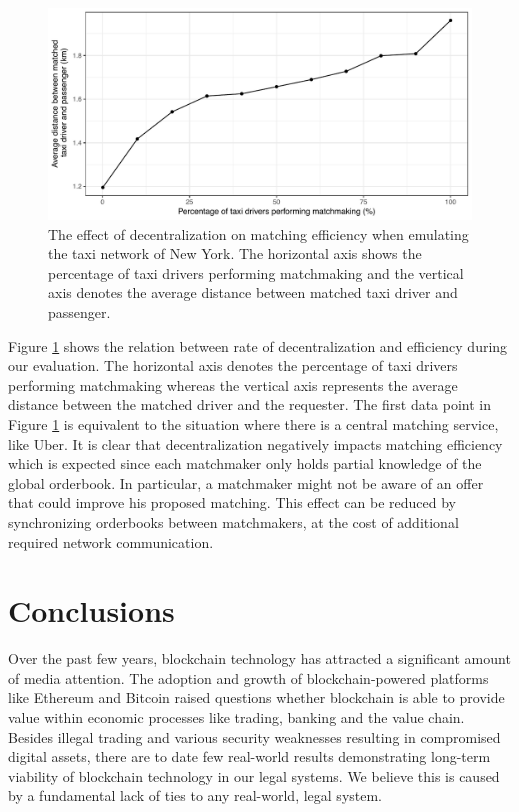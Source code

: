 \documentclass[USenglish]{article}
\begin{document}
\begin{figure}[t]
	\centering
	\includegraphics[width=0.9\columnwidth]{assets/matching_efficiency}
	\caption{The effect of decentralization on matching efficiency when emulating the taxi network of New York. The horizontal axis shows the percentage of taxi drivers performing matchmaking and the vertical axis denotes the average distance between matched taxi driver and passenger.}
	\label{fig:matching_efficiency}
\end{figure}

Figure \ref{fig:matching_efficiency} shows the relation between rate of decentralization and efficiency during our evaluation.
The horizontal axis denotes the percentage of taxi drivers performing matchmaking whereas the vertical axis represents the average distance between the matched driver and the requester.
The first data point in Figure \ref{fig:matching_efficiency} is equivalent to the situation where there is a central matching service, like Uber.
It is clear that decentralization negatively impacts matching efficiency which is expected since each matchmaker only holds partial knowledge of the global orderbook.
In particular, a matchmaker might not be aware of an offer that could improve his proposed matching.
This effect can be reduced by synchronizing orderbooks between matchmakers, at the cost of additional required network communication.

\section{Conclusions}

Over the past few years, blockchain technology has attracted a significant amount of media attention.
The adoption and growth of blockchain-powered platforms like Ethereum and Bitcoin raised questions whether blockchain is able to provide value within economic processes like trading, banking and the value chain.
Besides illegal trading and various security weaknesses resulting in compromised digital assets, there are to date few real-world results demonstrating long-term viability of blockchain technology in our legal systems.
We believe this is caused by a fundamental lack of ties to any real-world, legal system.
\end{document}
